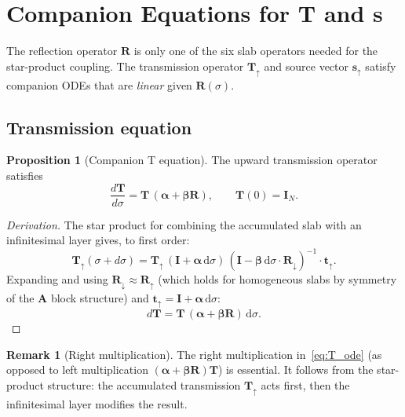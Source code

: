 \documentclass[11pt,a4paper]{article}
\newcommand{\vect}[1]{\bm{#1}}
\newcommand{\mat}[1]{\mathbf{#1}}
\newcommand{\dd}{\,\mathrm{d}}
\theoremstyle{definition}
\newtheorem{proposition}{Proposition}
\newtheorem{remark}{Remark}
\begin{document}
\section{Companion Equations for T and s}
\label{sec:companion}

The reflection operator $\mat{R}$ is only one of the six slab
operators needed for the star-product coupling.  The transmission
operator $\mat{T}_\uparrow$ and source vector $\vect{s}_\uparrow$
satisfy companion ODEs that are \emph{linear} given $\mat{R}(\sigma)$.

\subsection{Transmission equation}

\begin{proposition}[Companion T equation]\label{prop:companion_T}
The upward transmission operator satisfies
\begin{equation}\label{eq:T_ode}
  \frac{d\mat{T}}{d\sigma} = \mat{T}\,(\mat{\alpha}+\mat{\beta}\mat{R}),
  \qquad \mat{T}(0) = \mat{I}_N.
\end{equation}
\end{proposition}

\begin{proof}[Derivation]
The star product for combining the accumulated slab with an
infinitesimal layer gives, to first order:
\begin{equation}
  \mat{T}_\uparrow(\sigma+d\sigma)
  = \mat{T}_\uparrow\,(\mat{I}+\mat{\alpha}\dd\sigma)
    \,(\mat{I}-\mat{\beta}\dd\sigma\cdot\mat{R}_\downarrow)^{-1}
    \cdot\mat{t}_\uparrow.
\end{equation}
Expanding and using $\mat{R}_\downarrow\approx\mat{R}_\uparrow$
(which holds for homogeneous slabs by symmetry of the $\mat{A}$
block structure) and $\mat{t}_\uparrow=\mat{I}+\mat{\alpha}\dd\sigma$:
\begin{equation}
  d\mat{T} = \mat{T}\,(\mat{\alpha}+\mat{\beta}\mat{R})\dd\sigma.
\end{equation}
\end{proof}

\begin{remark}[Right multiplication]
The right multiplication in~\eqref{eq:T_ode} (as opposed to left
multiplication $(\mat{\alpha}+\mat{\beta}\mat{R})\mat{T}$) is
essential.  It follows from the star-product structure: the
accumulated transmission $\mat{T}_\uparrow$ acts first, then the
infinitesimal layer modifies the result.
\end{remark}
\end{document}
